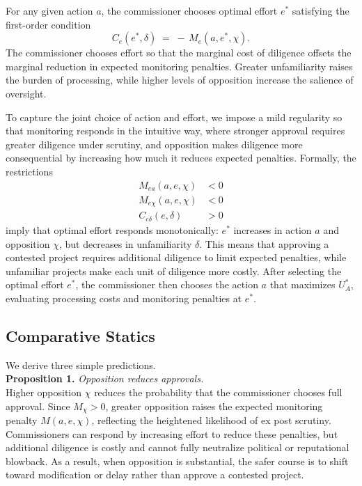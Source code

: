 For any given action $a$, the commissioner chooses optimal effort $e^*$ satisfying the first-order condition
\begin{equation}
    C_{e}(e^*,\delta) \;=\; -\, M_{e}(a,e^*,\chi).
    \label{eq:effortFOC}
\end{equation}
The commissioner chooses effort so that the marginal cost of diligence offsets the marginal reduction in expected monitoring penalties. Greater unfamiliarity raises the burden of processing, while higher levels of opposition increase the salience of oversight.

To capture the joint choice of action and effort, we impose a mild regularity so that monitoring responds in the intuitive way, where stronger approval requires greater diligence under scrutiny, and opposition makes diligence more consequential by increasing how much it reduces expected penalties. Formally, the restrictions
\[
\begin{aligned}
M_{ea}(a,e,\chi) &< 0 \\
M_{e\chi}(a,e,\chi) &< 0 \\
C_{e\delta}(e,\delta) &> 0
\end{aligned}
\]
imply that optimal effort responds monotonically: $e^*$ increases in action $a$ and opposition $\chi$, but decreases in unfamiliarity $\delta$. This means that approving a contested project requires additional diligence to limit expected penalties, while unfamiliar projects make each unit of diligence more costly. After selecting the optimal effort $e^*$, the commissioner then chooses the action $a$ that maximizes $U_A^*$, evaluating processing costs and monitoring penalties at $e^*$.

\subsection{Comparative Statics}

We derive three simple predictions.\\


\textbf{Proposition 1.} \textit{Opposition reduces approvals.}\\

Higher opposition $\chi$ reduces the probability that the commissioner chooses full approval. Since $M_\chi > 0$, greater opposition raises the expected monitoring penalty $M(a,e,\chi)$, reflecting the heightened likelihood of ex post scrutiny. Commissioners can respond by increasing effort to reduce these penalties, but additional diligence is costly and cannot fully neutralize political or reputational blowback. As a result, when opposition is substantial, the safer course is to shift toward modification or delay rather than approve a contested project.\\

